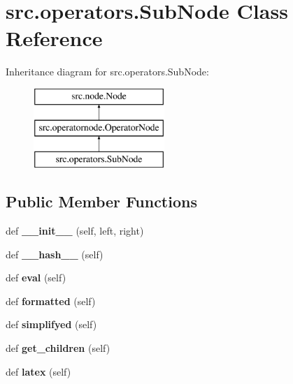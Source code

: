 \hypertarget{classsrc_1_1operators_1_1SubNode}{}\section{src.\+operators.\+Sub\+Node Class Reference}
\label{classsrc_1_1operators_1_1SubNode}
Inheritance diagram for src.\+operators.\+Sub\+Node\+:\begin{figure}[H]
\begin{center}
\leavevmode
\includegraphics[height=3.000000cm]{classsrc_1_1operators_1_1SubNode}
\end{center}
\end{figure}
\subsection*{Public Member Functions}
\begin{DoxyCompactItemize}
\item 
\mbox{\label{classsrc_1_1operators_1_1SubNode_a16fe3afdaf1dd064dea307baf7a224da}} 
def {\bfseries \+\_\+\+\_\+init\+\_\+\+\_\+} (self, left, right)
\item 
\mbox{\label{classsrc_1_1operators_1_1SubNode_adc0745a196130d08389b5e92adfa10f5}} 
def {\bfseries \+\_\+\+\_\+hash\+\_\+\+\_\+} (self)
\item 
\mbox{\label{classsrc_1_1operators_1_1SubNode_aa3893c64dbc93a612f7b5cac77c46b9d}} 
def {\bfseries eval} (self)
\item 
\mbox{\label{classsrc_1_1operators_1_1SubNode_a40115edd84365abcddf4a447d927595c}} 
def {\bfseries formatted} (self)
\item 
\mbox{\label{classsrc_1_1operators_1_1SubNode_a4ebc919be9178d06b86483ded2cc5804}} 
def {\bfseries simplifyed} (self)
\item 
\mbox{\label{classsrc_1_1operators_1_1SubNode_af73a5753bd8a68b4f8ea824ecdf01270}} 
def {\bfseries get\+\_\+children} (self)
\item 
\mbox{\label{classsrc_1_1operators_1_1SubNode_ae47f713a60829825fd8c9bc6ca48d0f5}} 
def {\bfseries latex} (self)
\end{DoxyCompactItemize}
